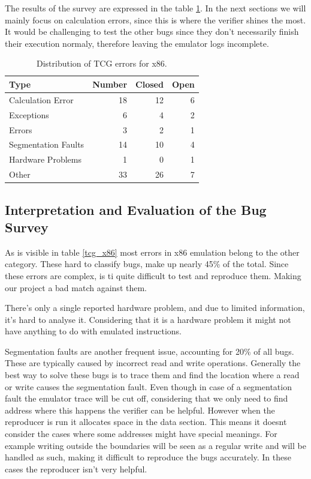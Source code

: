 The results of the survey are expressed in the table \ref{tab:tcg_x86}.
In the next sections we will mainly focus on calculation errors, since this is where the verifier shines the most.
It would be challenging to test the other bugs since they don't necessarily finish their execution normaly, therefore leaving the emulator logs incomplete.

\begin{table}[htpb]
    \caption[x86 TCG error distribution]{Distribution of TCG errors for x86.}\label{tab:tcg_x86}
    \centering
    \begin{tabular}{l r r r}
      \toprule
        Type & Number & Closed & Open \\
      \midrule
        Calculation Error & 18 & 12 & 6 \\
        Exceptions & 6 & 4 & 2 \\
        Errors & 3 & 2 & 1 \\
        Segmentation Faults & 14 & 10 & 4 \\
        Hardware Problems & 1 & 0 & 1 \\
        Other & 33 & 26 & 7 \\
      \bottomrule
    \end{tabular}
\end{table}

\subsection{Interpretation and Evaluation of the Bug Survey}
As is visible in table \ref{tcg_x86} most errors in x86 emulation belong to the other category.
These hard to classify bugs, make up nearly 45\% of the total.
Since these errors are complex, is ti quite difficult to test and reproduce them.
Making our project a bad match against them.

There's only a single reported hardware problem, and due to limited information, it's hard to analyse it.
Considering that it is a hardware problem it might not have anything to do with emulated instructions.

Segmentation faults are another frequent issue, accounting for 20\% of all bugs.
These are typically caused by incorrect read and write operations.
Generally the best way to solve these bugs is to trace them and find the location where a read or write causes the segmentation fault.
Even though in case of a segmentation fault the emulator trace will be cut off, considering that we only need to find address where this happens the verifier can be helpful.
However when the reproducer is run it allocates space in the data section.
This means it doesnt consider the cases where some addresses might have special meanings.
For example writing outside the boundaries will be seen as a regular write and will be handled as such, making it difficult to reproduce the bugs accurately.
In these cases the reproducer isn't very helpful.

